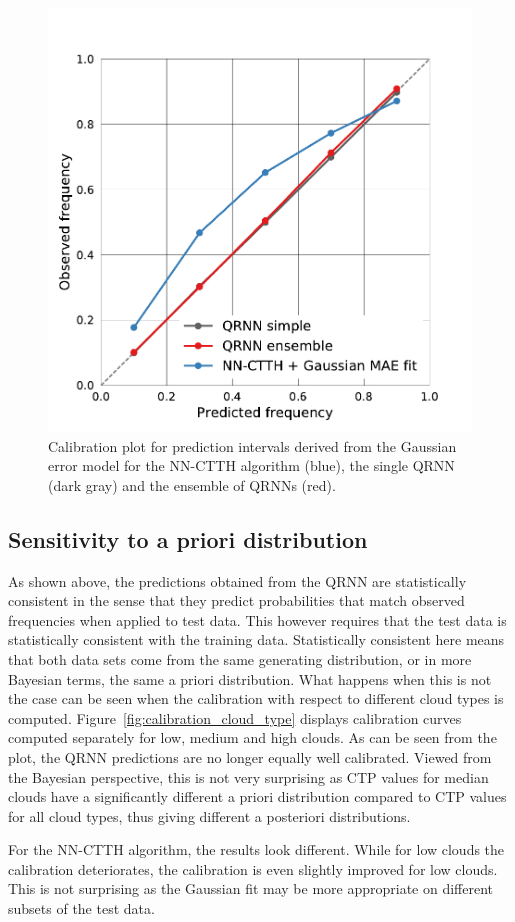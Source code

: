 \documentclass[journal abbreviation, manuscript]{copernicus}
\begin{document}
  \begin{figure}[hbpt!]
    \centering
    \includegraphics[width = 0.5\linewidth]{../plots/fig10}
    \caption{Calibration plot for prediction intervals derived from the Gaussian
      error model for the NN-CTTH algorithm (blue), the single QRNN (dark gray) and
      the ensemble of QRNNs (red).}
    \label{fig:calibration}
  \end{figure}

\subsection{Sensitivity to a priori distribution}

As shown above, the predictions obtained from the QRNN are statistically
consistent in the sense that they predict probabilities that match observed
frequencies when applied to test data. This however requires that the test data
is statistically consistent with the training data. Statistically consistent
here means that both data sets come from the same generating distribution, or in
more Bayesian terms, the same a priori distribution. What happens when this is
not the case can be seen when the calibration with respect to different cloud
types is computed. Figure~\ref{fig:calibration_cloud_type} displays calibration
curves computed separately for low, medium and high clouds. As can be seen from the plot, the QRNN
predictions are no longer equally well calibrated. Viewed from the Bayesian
perspective, this is not very surprising as CTP values for median clouds have a
significantly different a priori distribution compared to CTP values for all
cloud types, thus giving different a posteriori distributions.

 For the NN-CTTH algorithm, the results look different. While for low clouds
the calibration deteriorates, the calibration is even slightly improved for
low clouds. This is not surprising as the Gaussian fit may be more
appropriate on different subsets of the test data. 
\end{document}
